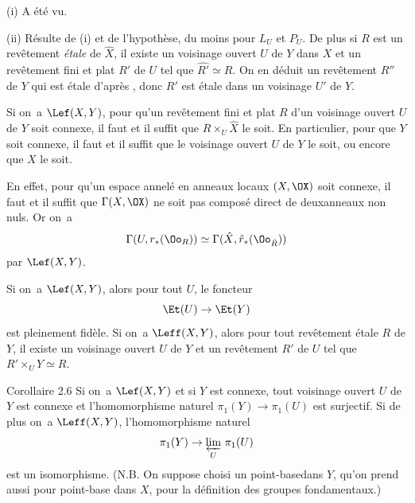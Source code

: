 (i) A \'et\'e vu.

(ii) R\'esulte de (i) et de l'hypoth\`ese, du moins pour $L_U$ et $P_U$. De plus si $R$ est un rev\^etement \emph{\'etale} de $\hat{X}$, il existe un voisinage ouvert $U$ de $Y$ dans $X$ et un rev\^etement fini et plat $R'$ de $U$ tel que $\widehat{R'} \simeq R$. On en d\'eduit un rev\^etement $R''$ de $Y$ qui est \'etale d'apr\`es , donc $R'$ est \'etale dans un voisinage $U'$ de $Y$. \cqfd

\begin{corollaire} \label{X.2.4}
Si on~a $\Lef (X, Y)$, pour qu'un rev\^etement fini et plat $R$ d'un voisinage ouvert $U$ de $Y$ soit connexe, il faut et il suffit que $R \times_U \hat{X}$ le soit. En particulier, pour que $Y$ soit connexe, il faut et il suffit que le voisinage ouvert $U$ de $Y$ le soit, ou encore que $X$ le soit.
\end{corollaire}

En effet, pour qu'un espace annel\'e en anneaux locaux $(X, \OX)$ soit connexe, il faut et il suffit que $\Gamma(X, \OX)$ ne soit pas compos\'e direct de deux\pageoriginale anneaux non nuls. Or on~a
\[
\Gamma(U, r_\ast(\Oo_R)) \simeq \Gamma(\hat{X}, \hat{r}_\ast(\Oo_{\hat{R}}))
\]
par $\Lef(X, Y)$.

\begin{corollaire} \label{X.2.5} Si on~a $\Lef (X, Y)$, alors pour tout $U$, le foncteur
\[
\Et(U) \to \Et(Y)
\]
est pleinement fid\`ele. Si on~a $\Leff(X, Y)$, alors pour tout rev\^etement \'etale $R$ de $Y$, il existe un voisinage ouvert $U$ de $Y$ et un rev\^etement $R'$ de $U$ tel que $R' \times_U Y \simeq R$.
\end{corollaire}

\label{X.2.6}
\begin{enonce*}{Corollaire 2.6\ndemark}
Si on~a $\Lef(X, Y)$ et si $Y$ est connexe, tout voisinage ouvert $U$ de $Y$ est connexe et l'homomorphisme naturel $\pi_1(Y)\to\pi_1(U)$ est surjectif. Si de plus on~a $\Leff(X, Y)$, l'homomorphisme naturel
\[
\pi_1(Y) \to \varprojlim_{U}\, \pi_1(U)
\]
est un isomorphisme. (N.B. On suppose choisi un \og point-base\fg dans $Y$, qu'on prend aussi pour point-base dans $X$, pour la d\'efinition des groupes fondamentaux.)
\end{enonce*}

